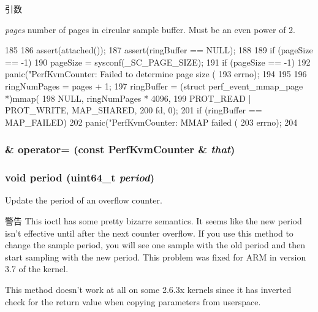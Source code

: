 \begin{DoxyParams}{引数}
\item[{\em pages}]number of pages in circular sample buffer. Must be an even power of 2. \end{DoxyParams}



\begin{DoxyCode}
185 {
186     assert(attached());
187     assert(ringBuffer == NULL);
188 
189     if (pageSize == -1) {
190         pageSize = sysconf(_SC_PAGE_SIZE);
191         if (pageSize == -1)
192             panic("PerfKvmCounter: Failed to determine page size (%
193                   errno);
194     }
195 
196     ringNumPages = pages + 1;
197     ringBuffer = (struct perf_event_mmap_page *)mmap(
198         NULL, ringNumPages * 4096,
199         PROT_READ | PROT_WRITE, MAP_SHARED,
200         fd, 0);
201     if (ringBuffer == MAP_FAILED)
202         panic("PerfKvmCounter: MMAP failed (%
203               errno);
204 }
\end{DoxyCode}
\hypertarget{classPerfKvmCounter_a11a80ba1c558b286f8459d8bbe60fe3f}{
\subsubsection[{operator=}]{\& operator= (const {\bf PerfKvmCounter} \& {\em that})}}
\label{classPerfKvmCounter_a11a80ba1c558b286f8459d8bbe60fe3f}
\hypertarget{classPerfKvmCounter_a08ec1e452f32c7b0e573d63f126a2bbf}{
\subsubsection[{period}]{\setlength{\rightskip}{0pt plus 5cm}void period (uint64\_\-t {\em period})}}
\label{classPerfKvmCounter_a08ec1e452f32c7b0e573d63f126a2bbf}
Update the period of an overflow counter.

\begin{DoxyWarning}{警告}
This ioctl has some pretty bizarre semantics. It seems like the new period isn't effective until after the next counter overflow. If you use this method to change the sample period, you will see one sample with the old period and then start sampling with the new period. This problem was fixed for ARM in version 3.7 of the kernel.

This method doesn't work at all on some 2.6.3x kernels since it has inverted check for the return value when copying parameters from userspace.
\end{DoxyWarning}

